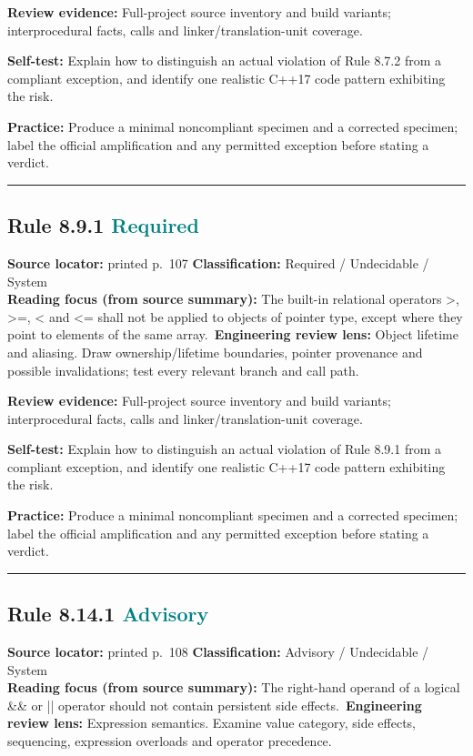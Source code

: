 \documentclass[10pt,letterpaper]{article}
\begin{document}
\textbf{Review evidence:} Full-project source inventory and build variants; interprocedural facts, calls and linker/translation-unit coverage.

\textbf{Self-test:} Explain how to distinguish an actual violation of Rule 8.7.2 from a compliant exception, and identify one realistic C++17 code pattern exhibiting the risk.\par
\textbf{Practice:} Produce a minimal noncompliant specimen and a corrected specimen; label the official amplification and any permitted exception before stating a verdict.
\smallskip\hrule\smallskip
\subsection*{Rule 8.9.1 \enspace \texorpdfstring{\small\textcolor{teal}{Required}}{Required}}
\noindent\textbf{Source locator:} printed p.~107 \quad\textbf{Classification:} Required / Undecidable / System\\
\textbf{Reading focus (from source summary):} The built-in relational operators \textgreater{}, \textgreater{}=, \textless{} and \textless{}= shall not be applied to objects of pointer type, except where they point to elements of the same array.\
\textbf{Engineering review lens:} Object lifetime and aliasing. Draw ownership/lifetime boundaries, pointer provenance and possible invalidations; test every relevant branch and call path.

\textbf{Review evidence:} Full-project source inventory and build variants; interprocedural facts, calls and linker/translation-unit coverage.

\textbf{Self-test:} Explain how to distinguish an actual violation of Rule 8.9.1 from a compliant exception, and identify one realistic C++17 code pattern exhibiting the risk.\par
\textbf{Practice:} Produce a minimal noncompliant specimen and a corrected specimen; label the official amplification and any permitted exception before stating a verdict.
\smallskip\hrule\smallskip
\subsection*{Rule 8.14.1 \enspace \texorpdfstring{\small\textcolor{teal}{Advisory}}{Advisory}}
\noindent\textbf{Source locator:} printed p.~108 \quad\textbf{Classification:} Advisory / Undecidable / System\\
\textbf{Reading focus (from source summary):} The right-hand operand of a logical \&\& or || operator should not contain persistent side effects.\
\textbf{Engineering review lens:} Expression semantics. Examine value category, side effects, sequencing, expression overloads and operator precedence.
\end{document}
